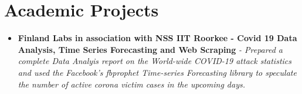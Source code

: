 \documentclass{article}
\begin{document}
    \section*{Academic Projects}
    \begin{itemize}
        \item{\textbf{\large{Finland Labs in association with NSS IIT Roorkee - Covid 19 Data Analysis, Time Series Forecasting and Web Scraping}}}
        \newline
        \textit{- Prepared a complete Data Analyis report on the World-wide COVID-19 attack statistics and used the Facebook's fbprophet Time-series Forecasting library to speculate the number of active corona victim cases in the upcoming days.} 
    

\end{itemize}
\end{document}
